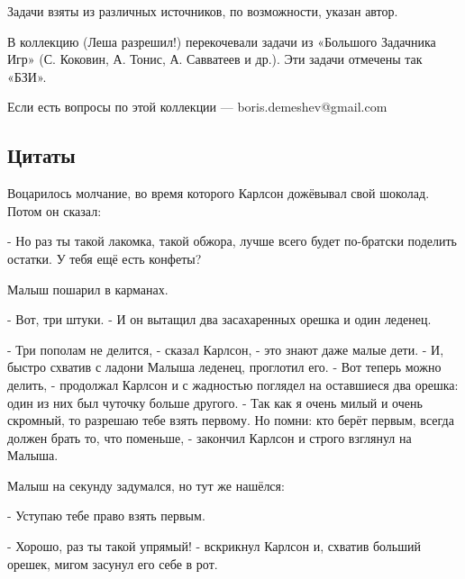 
Задачи взяты из различных источников, по возможности, указан автор.

В коллекцию (Леша разрешил!) перекочевали задачи из «Большого Задачника Игр» (С. Коковин, А. Тонис, А. Савватеев и др.). Эти задачи отмечены так «БЗИ».

Если есть вопросы по этой коллекции --- boris.demeshev@gmail.com





\subsection{Цитаты}

Воцарилось молчание, во время которого Карлсон дожёвывал свой шоколад. Потом он сказал:

- Но раз ты такой лакомка, такой обжора, лучше всего будет по-братски поделить остатки. У тебя ещё есть конфеты?

Малыш пошарил в карманах.

- Вот, три штуки. - И он вытащил два засахаренных орешка и один леденец.

- Три пополам не делится, - сказал Карлсон, - это знают даже малые дети. - И, быстро схватив с ладони Малыша леденец, проглотил его. - Вот теперь можно делить, - продолжал Карлсон и с жадностью поглядел на оставшиеся два орешка: один из них был чуточку больше другого. - Так как я очень милый и очень скромный, то разрешаю тебе взять первому. Но помни: кто берёт первым, всегда должен брать то, что поменьше, - закончил Карлсон и строго взглянул на Малыша.

Малыш на секунду задумался, но тут же нашёлся:

- Уступаю тебе право взять первым.

- Хорошо, раз ты такой упрямый! - вскрикнул Карлсон и, схватив больший орешек, мигом засунул его себе в рот.

